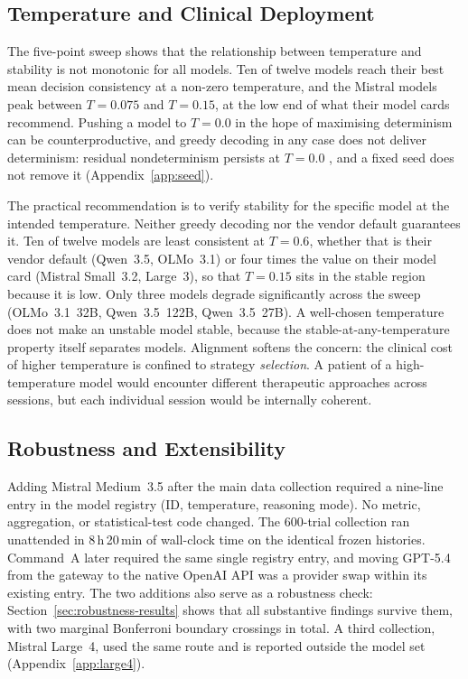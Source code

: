 \subsection{Temperature and Clinical Deployment}

The five-point sweep shows that the relationship between temperature and stability is not monotonic for all models. Ten of twelve models reach their best mean decision consistency at a non-zero temperature, and the Mistral models peak between $T{=}0.075$ and $T{=}0.15$, at the low end of what their model cards recommend. Pushing a model to $T{=}0.0$ in the hope of maximising determinism can be counterproductive, and greedy decoding in any case does not deliver determinism: residual nondeterminism persists at $T{=}0.0$ \citep{yuan2025understanding}, and a fixed seed does not remove it (Appendix~\ref{app:seed}).

The practical recommendation is to verify stability for the specific model at the intended temperature. Neither greedy decoding nor the vendor default guarantees it. Ten of twelve models are least consistent at $T{=}0.6$, whether that is their vendor default (Qwen~3.5, OLMo~3.1) or four times the value on their model card (Mistral Small~3.2, Large~3), so that $T{=}0.15$ sits in the stable region because it is low. Only three models degrade significantly across the sweep (OLMo~3.1~32B, Qwen~3.5~122B, Qwen~3.5~27B). A well-chosen temperature does not make an unstable model stable, because the stable-at-any-temperature property itself separates models. Alignment softens the concern: the clinical cost of higher temperature is confined to strategy \emph{selection}. A patient of a high-temperature model would encounter different therapeutic approaches across sessions, but each individual session would be internally coherent.

\subsection{Robustness and Extensibility}
\label{sec:robustness}

Adding Mistral Medium~3.5 after the main data collection required a nine-line entry in the model registry (ID, temperature, reasoning mode). No metric, aggregation, or statistical-test code changed. The 600-trial collection ran unattended in 8\,h\,20\,min of wall-clock time on the identical frozen histories. Command~A later required the same single registry entry, and moving GPT-5.4 from the gateway to the native OpenAI API was a provider swap within its existing entry. The two additions also serve as a robustness check: Section~\ref{sec:robustness-results} shows that all substantive findings survive them, with two marginal Bonferroni boundary crossings in total. A third collection, Mistral Large~4, used the same route and is reported outside the model set (Appendix~\ref{app:large4}).


